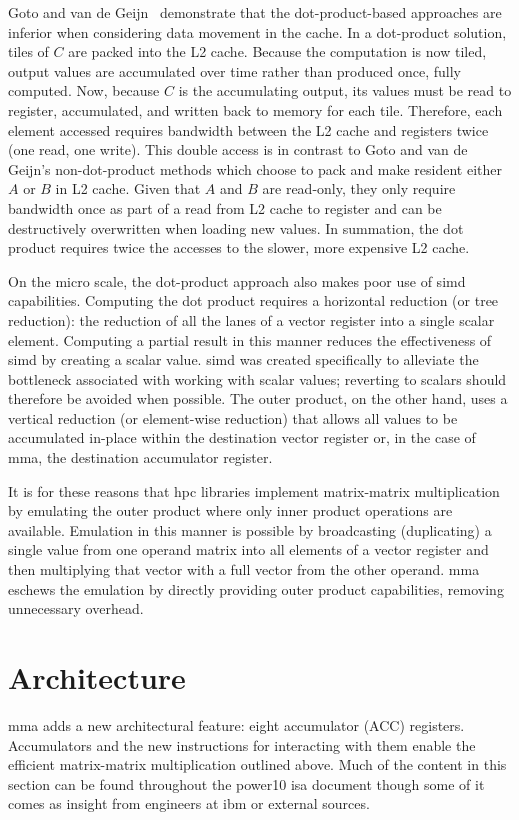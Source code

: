 \documentclass[\main/thesis.tex]{subfiles}
\begin{document}
Goto and van de Geijn~\autocite{goto2008anatomy} demonstrate that the dot-product-based approaches are inferior when considering data movement in the cache.
In a dot-product solution, tiles of $C$ are packed into the L2 cache.
Because the computation is now tiled, output values are accumulated over time rather than produced once, fully computed.
Now, because $C$ is the accumulating output, its values must be read to register, accumulated, and written back to memory for each tile.
Therefore, each element accessed requires bandwidth between the L2 cache and registers twice (one read, one write).
This double access is in contrast to Goto and van de Geijn's non-dot-product methods which choose to pack and make resident either $A$ or $B$ in L2 cache.
Given that $A$ and $B$ are read-only, they only require bandwidth once as part of a read from L2 cache to register and can be destructively overwritten when loading new values.
In summation, the dot product requires twice the accesses to the slower, more expensive L2 cache.

On the micro scale, the dot-product approach also makes poor use of \gls{simd} capabilities.
Computing the dot product requires a horizontal reduction (or tree reduction): the reduction of all the lanes of a vector register into a single scalar element.
Computing a partial result in this manner reduces the effectiveness of \gls{simd} by creating a scalar value.
\Gls{simd} was created specifically to alleviate the bottleneck associated with working with scalar values; reverting to scalars should therefore be avoided when possible.
The outer product, on the other hand, uses a vertical reduction (or element-wise reduction) that allows all values to be accumulated in-place within the destination vector register or, in the case of \gls{mma}, the destination accumulator register.

It is for these reasons that \gls{hpc} libraries implement matrix-matrix multiplication by emulating the outer product where only inner product operations are available.
Emulation in this manner is possible by broadcasting (duplicating) a single value from one operand matrix into all elements of a vector register and then multiplying that vector with a full vector from the other operand.
\Gls{mma} eschews the emulation by directly providing outer product capabilities, removing unnecessary overhead.

\section{Architecture}
\gls{mma} adds a new architectural feature: eight accumulator (ACC) registers.
Accumulators and the new instructions for interacting with them enable the efficient matrix-matrix multiplication outlined above.
Much of the content in this section can be found throughout the \gls{power10} \gls{isa} document though some of it comes as insight from engineers at \gls{ibm} or external sources.
\end{document}
